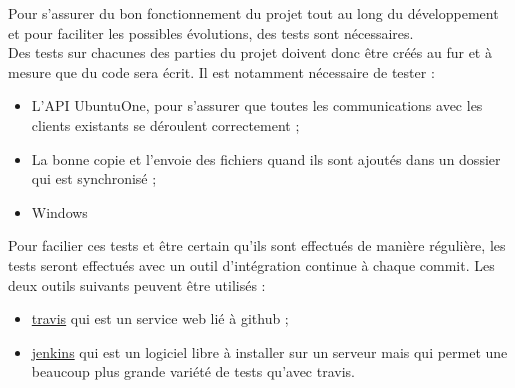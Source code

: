 Pour s'assurer du bon fonctionnement du projet tout au long du développement et pour faciliter les possibles évolutions, des tests sont nécessaires.\\

Des tests sur chacunes des parties du projet doivent donc être créés au fur et à mesure que du code sera écrit. Il est notamment nécessaire de tester :\\

\begin{itemize}
\renewcommand{\labelitemi}{$\bullet$}
\item L'API UbuntuOne, pour s'assurer que toutes les communications avec les clients existants se déroulent correctement ;
\item La bonne copie et l'envoie des fichiers quand ils sont ajoutés dans un dossier qui est synchronisé ;
\item Windows
\end{itemize}

\vspace{0.5cm}

Pour facilier ces tests et être certain qu'ils sont effectués de manière régulière, les tests seront effectués avec un outil d'intégration continue à chaque commit. Les deux outils suivants peuvent être utilisés :\\

\begin{itemize}
\renewcommand{\labelitemi}{$\bullet$}
\item \href{https://travis-ci.org}{travis} qui est un service web lié à github ;
\item \href{http://jenkins-ci.org}{jenkins} qui est un logiciel libre à installer sur un serveur mais qui permet une beaucoup plus grande variété de tests qu'avec travis.
\end{itemize}
